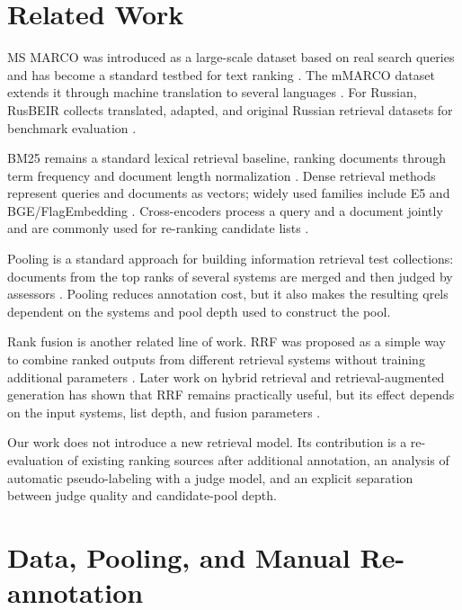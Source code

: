 \documentclass[runningheads,a4paper]{llncs}
\begin{document}
\section{Related Work}

MS MARCO was introduced as a large-scale dataset based on real search queries and has become a standard testbed for text ranking \cite{bajaj2016msmarco}. The mMARCO dataset extends it through machine translation to several languages \cite{bonifacio2022mmarco}. For Russian, RusBEIR collects translated, adapted, and original Russian retrieval datasets for benchmark evaluation \cite{2025rusbeir}.

BM25 remains a standard lexical retrieval baseline, ranking documents through term frequency and document length normalization \cite{robertson2009bm25}. Dense retrieval methods represent queries and documents as vectors; widely used families include E5 \cite{wang2022e5} and BGE/FlagEmbedding \cite{xiao2023cpack}. Cross-encoders process a query and a document jointly and are commonly used for re-ranking candidate lists \cite{nogueira2019bert}.

Pooling is a standard approach for building information retrieval test collections: documents from the top ranks of several systems are merged and then judged by assessors \cite{voorhees2005trec}. Pooling reduces annotation cost, but it also makes the resulting qrels dependent on the systems and pool depth used to construct the pool.

Rank fusion is another related line of work. RRF was proposed as a simple way to combine ranked outputs from different retrieval systems without training additional parameters \cite{cormack2009rrf}. Later work on hybrid retrieval and retrieval-augmented generation has shown that RRF remains practically useful, but its effect depends on the input systems, list depth, and fusion parameters \cite{bruch2023fusion,mackenzie2023anserini,rackauckas2024ragfusion}.

Our work does not introduce a new retrieval model. Its contribution is a re-evaluation of existing ranking sources after additional annotation, an analysis of automatic pseudo-labeling with a judge model, and an explicit separation between judge quality and candidate-pool depth.

\section{Data, Pooling, and Manual Re-annotation}
\end{document}
